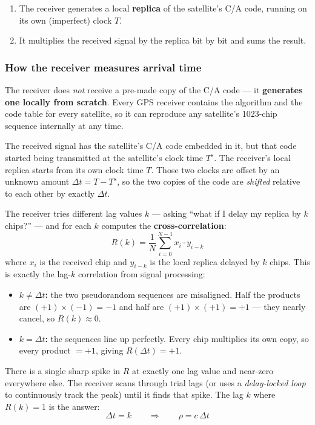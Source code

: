 \documentclass[12pt, a4paper]{article}
\begin{document}
\begin{enumerate}[leftmargin=1.5em, itemsep=3pt]
  \item The receiver generates a local \textbf{replica} of the satellite's
    C/A code, running on its own (imperfect) clock $T$.
  \item It multiplies the received signal by the replica bit by bit and sums
    the result.
\end{enumerate}
\subsubsection*{How the receiver measures arrival time}

The receiver does \emph{not} receive a pre-made copy of the C/A code ---
it \textbf{generates one locally from scratch}.
Every GPS receiver contains the algorithm and the code table for every
satellite, so it can reproduce any satellite's 1023-chip sequence
internally at any time.

The received signal has the satellite's C/A code embedded in it, but that
code started being transmitted at the satellite's clock time $T^s$.
The receiver's local replica starts from its own clock time $T$.
Those two clocks are offset by an unknown amount $\Delta t = T - T^s$, so
the two copies of the code are \emph{shifted} relative to each other by
exactly $\Delta t$.

The receiver tries different lag values $k$ --- asking ``what if I delay
my replica by $k$ chips?'' --- and for each $k$ computes the
\textbf{cross-correlation}:
\[
  R(k) = \frac{1}{N}\sum_{i=0}^{N-1} x_i \cdot y_{i-k}
\]
where $x_i$ is the received chip and $y_{i-k}$ is the local replica
delayed by $k$ chips.
This is exactly the lag-$k$ correlation from signal processing:

\begin{itemize}[leftmargin=1.5em, itemsep=3pt]
  \item \textbf{$k \neq \Delta t$:} the two pseudorandom sequences are
    misaligned.
    Half the products are $(+1)\times(-1) = -1$ and half are
    $(+1)\times(+1) = +1$ --- they nearly cancel, so $R(k) \approx 0$.
  \item \textbf{$k = \Delta t$:} the sequences line up perfectly.
    Every chip multiplies its own copy, so every product $= +1$, giving
    $R(\Delta t) = +1$.
\end{itemize}

There is a single sharp spike in $R$ at exactly one lag value and
near-zero everywhere else.
The receiver scans through trial lags (or uses a \emph{delay-locked loop}
to continuously track the peak) until it finds that spike.
The lag $k$ where $R(k) = 1$ is the answer:
\[
  \Delta t = k \qquad \Rightarrow \qquad \rho = c\,\Delta t
\]
\end{document}
